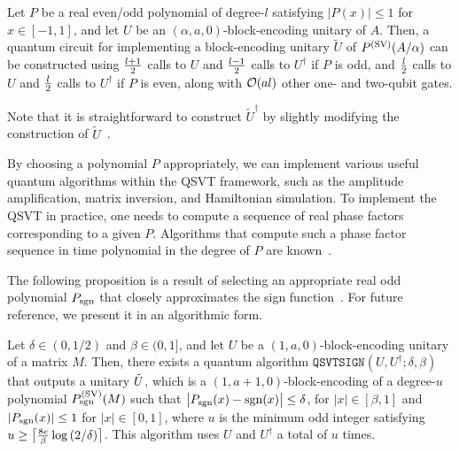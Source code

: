 \begin{theorem}
\label{prop:general QSVT}
Let $P$ be a real even/odd polynomial of degree-$l$ satisfying $|P(x)| \leq 1$ for $x \in [-1,1]$, and let $U$ be an $(\alpha, a, 0)$-block-encoding unitary of $A$.
Then, a quantum circuit for implementing a block-encoding unitary $\tilde{U}$ of $P^{(\rm SV)}(A/\alpha)$ can be constructed using $\frac{l+1}{2}$ calls to $U$ and $\frac{l-1}{2}$ calls to $U^\dag$ if $P$ is odd, and $\frac{l}{2}$ calls to $U$ and $\frac{l}{2}$ calls to $U^\dag$ if $P$ is even, along with ${\mathcal{O}}(al)$ other one- and two-qubit gates.  
\end{theorem}

Note that it is straightforward to construct $\tilde{U}^\dag$ by slightly modifying the construction of $\tilde{U}$~\cite{gilyen2019qsvt, Gilyn2019thesis, martyn2021grand}.


By choosing a polynomial $P$ appropriately, we can implement various useful quantum algorithms within the QSVT framework, such as the amplitude amplification, matrix inversion, and Hamiltonian simulation.
To implement the QSVT in practice, one needs to compute a sequence of real phase factors corresponding to a given $P$. Algorithms that compute such a phase factor sequence in time polynomial in the degree of $P$ are known~\cite{Haah2019product, Chao2020FindingAF, dong2021findingphase, Lin2022LectureNotes, Mizuta2023vzw}.







The following proposition is a result of selecting an appropriate real odd polynomial $P_{\mathrm{sgn}}$ that closely approximates the sign function~\cite{gilyen2019qsvt, Gilyn2019thesis, martyn2021grand}.
For future reference, we present it in an algorithmic form.

\begin{proposition}
\label{prop:FPAA general}
    Let $\delta \in (0, 1/2)$ and $\beta \in (0, 1]$, and let $U$ be a $(1, a, 0)$-block-encoding unitary of a matrix $M$. Then, there exists a quantum algorithm $\mathtt{QSVTSIGN}(U, U^\dag; \delta, \beta)$ that outputs a unitary $\tilde{U}$, which is a $(1, a+1, 0)$-block-encoding of a degree-$u$ polynomial $P_{\mathrm{sgn}}^{(\rm SV)}(M)$ such that $\big|P_{\mathrm{sgn}}(x) - \mathrm{sgn}(x)\big| \leq \delta$,
    for $|x| \in [\beta, 1]$ and $|P_{\mathrm{sgn}}(x)| \leq 1$ for $|x| \in [0, 1]$, where $u$ is the minimum odd integer satisfying $u \geq \big\lceil\frac{8e}{\beta}\log{(2/\delta)}\big\rceil$.
    This algorithm uses $U$ and $U^\dag$ a total of $u$ times.
\end{proposition}


